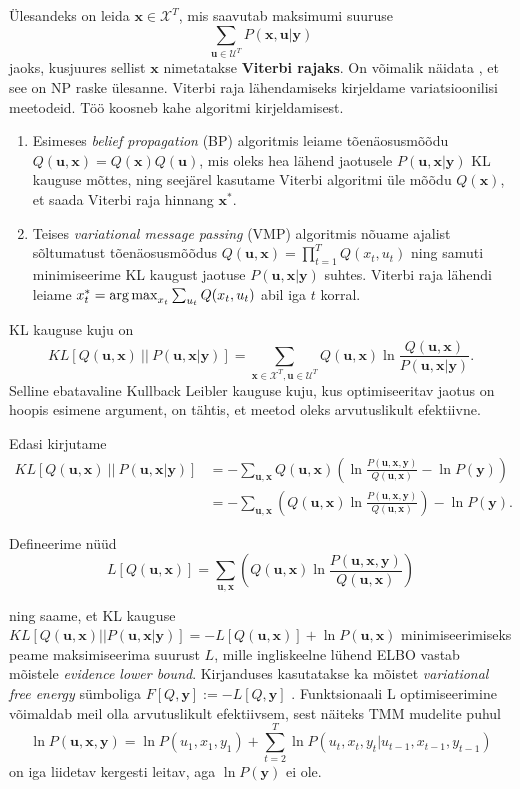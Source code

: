 Ülesandeks on leida $\bm{x} \in \mathcal{X}^T$, mis saavutab maksimumi suuruse 
$$\sum_{\bm{u} \in \mathcal{U}^T}{P(\bm{x}, \bm{u} | \bm{y})}$$
jaoks, kusjuures sellist $\mathbf{x}$ nimetatakse \textbf{Viterbi rajaks}. On võimalik näidata \parencite{LYNGSO2002545}, et see on NP raske ülesanne. Viterbi raja lähendamiseks kirjeldame variatsioonilisi meetodeid. Töö koosneb kahe algoritmi kirjeldamisest.
\begin{enumerate}
    \item Esimeses \emph{belief propagation} (BP) algoritmis leiame tõenäosusmõõdu $Q(\bm{u}, \bm{x}) = Q(\bm{x})Q(\bm{u})$, mis oleks hea lähend jaotusele $P(\bm{u},\bm{x} | \bm{y})$ KL kauguse mõttes, ning seejärel kasutame Viterbi algoritmi üle mõõdu $Q(\bm{x})$, et saada Viterbi raja hinnang $\bm{x}^*$.
    \item Teises \emph{variational message passing} (VMP) algoritmis nõuame ajalist sõltumatust tõenäosusmõõdus $Q(\bm{u}, \bm{x}) = \prod_{t=1}^T Q(x_t,u_t)$ ning samuti minimiseerime KL kaugust jaotuse $P(\bm{u},\bm{x} | \bm{y})$ suhtes. Viterbi raja lähendi leiame $x_t^* = \operatorname*{arg\,max}_{x_t} \sum_{u_t} Q(x_t,u_t)$ abil iga $t$ korral.
\end{enumerate}

KL kauguse kuju on
$$KL[Q(\bm{u}, \bm{x}) \ ||\ P(\bm{u}, \bm{x} | \bm{y})] = \sum_{\bm{x} \in \mathcal{X}^T, \bm{u} \in \mathcal{U}^T} Q(\bm{u}, \bm{x}) \ln \frac{Q(\bm{u}, \bm{x})}{P(\bm{u}, \bm{x} | \bm{y})}.$$
Selline ebatavaline Kullback Leibler kauguse kuju, kus optimiseeritav jaotus on hoopis esimene argument, on tähtis, et meetod oleks arvutuslikult efektiivne. 

Edasi kirjutame 
\begin{align}
    \label{eq:kl}
    KL[Q(\bm{u}, \bm{x}) \ ||\ P(\bm{u}, \bm{x} | \bm{y})] &= - \sum_{\bm{u}, \bm{x}} Q(\bm{u}, \bm{x}) \left( \ln \frac{P(\bm{u}, \bm{x}, \bm{y})}{Q(\bm{u}, \bm{x})} - \ln P(\bm{y}) \right) \\
    \nonumber
    &= - \sum_{\bm{u}, \bm{x}} \left( Q(\bm{u}, \bm{x}) \ln \frac{P(\bm{u}, \bm{x}, \bm{y})}{Q(\bm{u}, \bm{x})}\right) - \ln P(\bm{y}).
\end{align}

Defineerime nüüd
\begin{equation}
\label{eq:elbo}
L[Q(\bm{u}, \bm{x})] = \sum_{\bm{u}, \bm{x}} \left( Q(\bm{u}, \bm{x}) \ln \frac{P(\bm{u}, \bm{x}, \bm{y})}{Q(\bm{u}, \bm{x})}\right)
\end{equation}

ning saame, et KL kauguse $KL[Q(\bm{u}, \bm{x}) || P(\bm{u}, \bm{x} | \bm{y})] = -L[Q(\bm{u}, \bm{x})] + \ln P(\bm{u}, \bm{x})$ minimiseerimiseks peame maksimiseerima suurust $L$, mille ingliskeelne lühend ELBO vastab mõistele \textit{evidence lower bound}. Kirjanduses kasutatakse ka mõistet \textit{variational free energy} sümboliga $F[Q, \bm{y}] := -L[Q, \bm{y}]$ \parencite{Parr.2019}. Funktsionaali L optimiseerimine võimaldab meil olla arvutuslikult efektiivsem, sest näiteks TMM mudelite puhul 
$$\ln P(\bm{u}, \bm{x}, \bm{y}) = \ln P(u_1, x_1, y_1) + \sum_{t=2}^T \ln P(u_t, x_t, y_t | u_{t-1}, x_{t-1}, y_{t-1})$$
on iga liidetav kergesti leitav, aga $\ln P(\mathbf{y})$ ei ole.

